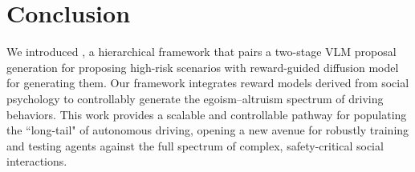 \section{Conclusion}
We introduced \our, a hierarchical framework that pairs a two-stage VLM proposal generation for proposing high-risk scenarios with reward-guided diffusion model for generating them. Our framework integrates reward models derived from social psychology to controllably generate the egoism--altruism spectrum of driving behaviors. This work provides a scalable and controllable pathway for populating the ``long-tail" of autonomous driving, opening a new avenue for robustly training and testing agents against the full spectrum of complex, safety-critical social interactions.